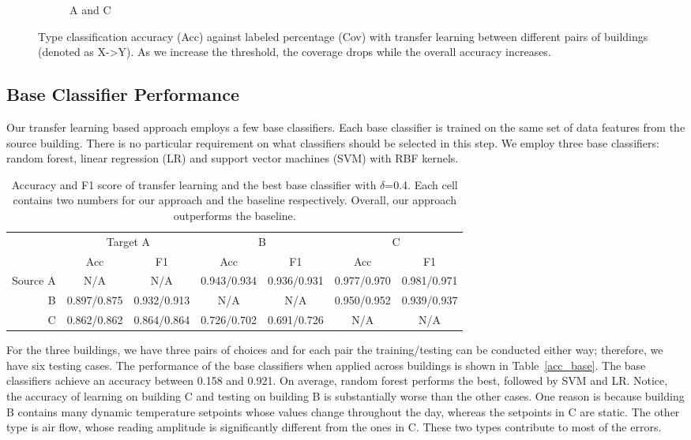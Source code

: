 \begin{figure}[ht!]
\begin{subfigure}{0.32\textwidth}
                \caption{A and C}
  \end{subfigure}
\caption{Type classification accuracy (Acc) against labeled percentage (Cov) with transfer learning between different pairs of buildings (denoted as X->Y). As we increase the threshold, the coverage drops while the overall accuracy increases. }
\label{fig:tl_acc}
\end{figure}

\subsection{Base Classifier Performance}
\label{sec:baseline}
Our transfer learning based approach employs a few base classifiers. Each base classifier is trained on the same set of data features from the source building. There is no particular requirement on 
what classifiers should be selected in this step.  
We employ three base classifiers: random forest, linear regression (LR) and support vector machines (SVM) with RBF kernels.


\begin{table}[]
\centering
\begin{tabular}{r|c|c|c|c|c|c}
\hline
\multirow{2}{*}{} & \multicolumn{2}{c|}{Target A} & \multicolumn{2}{c|}{B} & \multicolumn{2}{c}{C} \\ \cline{2-7} 
                  & Acc        & F1        & Acc        & F1        & Acc        & F1        \\ \hline
Source A                 & N/A      & N/A     & 0.943/0.934      & 0.936/0.931     & 0.977/0.970      & 0.981/0.971     \\ \hline
B                 & 0.897/0.875     & 0.932/0.913     & N/A      & N/A     & 0.950/0.952      & 0.939/0.937     \\ \hline
C                 & 0.862/0.862     & 0.864/0.864     & 0.726/0.702      & 0.691/0.726     & N/A     & N/A     \\ \hline
\end{tabular}
\caption{Accuracy and F1 score of transfer learning and the best base classifier with $\delta$=0.4. Each cell contains two numbers for our approach and the baseline respectively. Overall, our approach outperforms the baseline.}
\label{table:f1}
\end{table}

For the three buildings, we have three pairs of choices and for each pair the training/testing can be conducted either way; therefore, we have six testing cases.
The performance of the base classifiers when applied across buildings is shown in Table~\ref{acc_base}.  The base classifiers achieve an accuracy between 0.158 and 0.921.
On average, random forest performs the best, followed by SVM and LR. 
Notice, the accuracy of learning on building C and testing on building B is substantially worse than the other cases. 
One reason is because building B contains many dynamic temperature setpoints whose values change throughout the day, whereas the setpoints in C are static. 
The other type is air flow, whose reading amplitude is significantly different from the ones in C. These two types contribute to most of the errors. %


